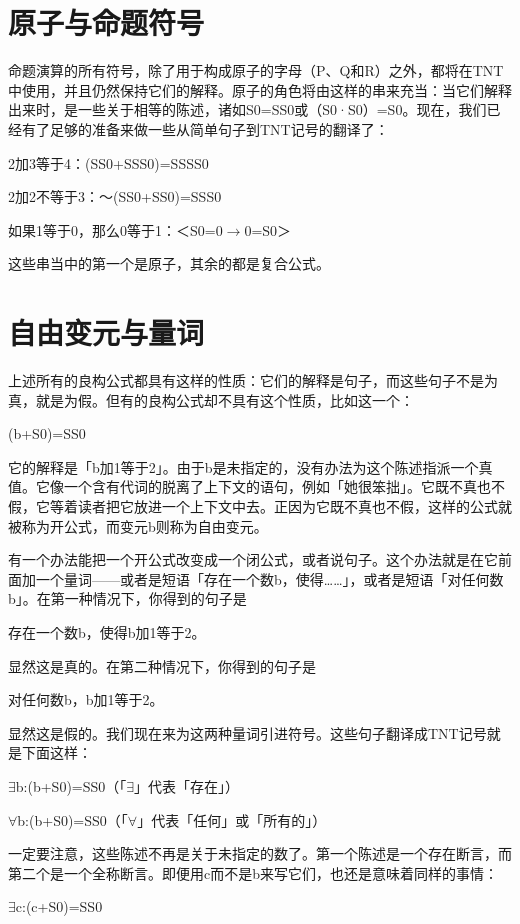 \documentclass[
  12pt,
  twoside,
  openright,
  oldfontcommands,
]{memoir}
\begin{document}
\section{原子与命题符号}

命题演算的所有符号，除了用于构成原子的字母（P、Q和R）之外，都将在TNT中使用，并且仍然保持它们的解释。原子的角色将由这样的串来充当：当它们解释出来时，是一些关于相等的陈述，诸如S0=SS0或（S0·S0）=S0。现在，我们已经有了足够的准备来做一些从简单句子到TNT记号的翻译了：

2加3等于4：(SS0+SSS0)=SSSS0

2加2不等于3：～(SS0+SS0)=SSS0

如果1等于0，那么0等于1：＜S0=0$\rightarrow$0=S0＞

这些串当中的第一个是原子，其余的都是复合公式。

\section{自由变元与量词}

上述所有的良构公式都具有这样的性质：它们的解释是句子，而这些句子不是为真，就是为假。但有的良构公式却不具有这个性质，比如这一个：

(b+S0)=SS0

它的解释是「b加1等于2」。由于b是未指定的，没有办法为这个陈述指派一个真值。它像一个含有代词的脱离了上下文的语句，例如「她很笨拙」。它既不真也不假，它等着读者把它放进一个上下文中去。正因为它既不真也不假，这样的公式就被称为开公式，而变元b则称为自由变元。

有一个办法能把一个开公式改变成一个闭公式，或者说句子。这个办法就是在它前面加一个量词------或者是短语「存在一个数b，使得\ldots\ldots」，或者是短语「对任何数b」。在第一种情况下，你得到的句子是

存在一个数b，使得b加1等于2。

显然这是真的。在第二种情况下，你得到的句子是

对任何数b，b加1等于2。

显然这是假的。我们现在来为这两种量词引进符号。这些句子翻译成TNT记号就是下面这样：

$\exists$b:(b+S0)=SS0{（「$\exists$」代表「存在」）}

$\forall$b:(b+S0)=SS0{（「$\forall$」代表「任何」或「所有的」）}

一定要注意，这些陈述不再是关于未指定的数了。第一个陈述是一个存在断言，而第二个是一个全称断言。即便用c而不是b来写它们，也还是意味着同样的事情：

$\exists$c:(c+S0)=SS0
\end{document}
